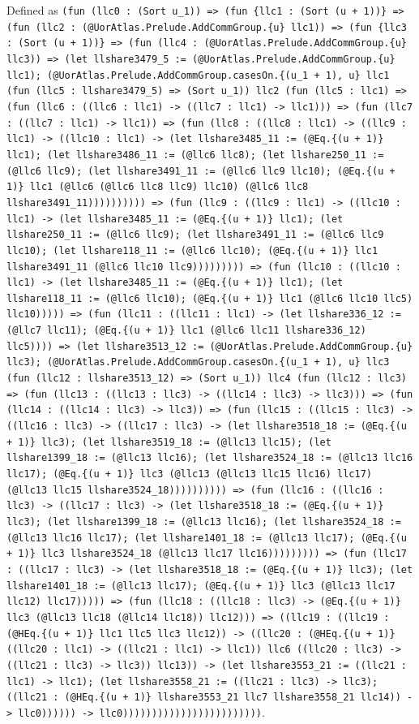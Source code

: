 \documentclass[11pt]{article}
\begin{document}
\noindent Defined as \texttt{(fun (llc0 : (Sort u\_1)) => (fun \{llc1 : (Sort (u + 1))\} => (fun (llc2 : (@UorAtlas.Prelude.AddCommGroup.\{u\} llc1)) => (fun \{llc3 : (Sort (u + 1))\} => (fun (llc4 : (@UorAtlas.Prelude.AddCommGroup.\{u\} llc3)) => (let llshare3479\_5 := (@UorAtlas.Prelude.AddCommGroup.\{u\} llc1); (@UorAtlas.Prelude.AddCommGroup.casesOn.\{(u\_1 + 1), u\} llc1 (fun (llc5 : llshare3479\_5) => (Sort u\_1)) llc2 (fun (llc5 : llc1) => (fun (llc6 : ((llc6 : llc1) -> ((llc7 : llc1) -> llc1))) => (fun (llc7 : ((llc7 : llc1) -> llc1)) => (fun (llc8 : ((llc8 : llc1) -> ((llc9 : llc1) -> ((llc10 : llc1) -> (let llshare3485\_11 := (@Eq.\{(u + 1)\} llc1); (let llshare3486\_11 := (@llc6 llc8); (let llshare250\_11 := (@llc6 llc9); (let llshare3491\_11 := (@llc6 llc9 llc10); (@Eq.\{(u + 1)\} llc1 (@llc6 (@llc6 llc8 llc9) llc10) (@llc6 llc8 llshare3491\_11)))))))))) => (fun (llc9 : ((llc9 : llc1) -> ((llc10 : llc1) -> (let llshare3485\_11 := (@Eq.\{(u + 1)\} llc1); (let llshare250\_11 := (@llc6 llc9); (let llshare3491\_11 := (@llc6 llc9 llc10); (let llshare118\_11 := (@llc6 llc10); (@Eq.\{(u + 1)\} llc1 llshare3491\_11 (@llc6 llc10 llc9))))))))) => (fun (llc10 : ((llc10 : llc1) -> (let llshare3485\_11 := (@Eq.\{(u + 1)\} llc1); (let llshare118\_11 := (@llc6 llc10); (@Eq.\{(u + 1)\} llc1 (@llc6 llc10 llc5) llc10))))) => (fun (llc11 : ((llc11 : llc1) -> (let llshare336\_12 := (@llc7 llc11); (@Eq.\{(u + 1)\} llc1 (@llc6 llc11 llshare336\_12) llc5)))) => (let llshare3513\_12 := (@UorAtlas.Prelude.AddCommGroup.\{u\} llc3); (@UorAtlas.Prelude.AddCommGroup.casesOn.\{(u\_1 + 1), u\} llc3 (fun (llc12 : llshare3513\_12) => (Sort u\_1)) llc4 (fun (llc12 : llc3) => (fun (llc13 : ((llc13 : llc3) -> ((llc14 : llc3) -> llc3))) => (fun (llc14 : ((llc14 : llc3) -> llc3)) => (fun (llc15 : ((llc15 : llc3) -> ((llc16 : llc3) -> ((llc17 : llc3) -> (let llshare3518\_18 := (@Eq.\{(u + 1)\} llc3); (let llshare3519\_18 := (@llc13 llc15); (let llshare1399\_18 := (@llc13 llc16); (let llshare3524\_18 := (@llc13 llc16 llc17); (@Eq.\{(u + 1)\} llc3 (@llc13 (@llc13 llc15 llc16) llc17) (@llc13 llc15 llshare3524\_18)))))))))) => (fun (llc16 : ((llc16 : llc3) -> ((llc17 : llc3) -> (let llshare3518\_18 := (@Eq.\{(u + 1)\} llc3); (let llshare1399\_18 := (@llc13 llc16); (let llshare3524\_18 := (@llc13 llc16 llc17); (let llshare1401\_18 := (@llc13 llc17); (@Eq.\{(u + 1)\} llc3 llshare3524\_18 (@llc13 llc17 llc16))))))))) => (fun (llc17 : ((llc17 : llc3) -> (let llshare3518\_18 := (@Eq.\{(u + 1)\} llc3); (let llshare1401\_18 := (@llc13 llc17); (@Eq.\{(u + 1)\} llc3 (@llc13 llc17 llc12) llc17))))) => (fun (llc18 : ((llc18 : llc3) -> (@Eq.\{(u + 1)\} llc3 (@llc13 llc18 (@llc14 llc18)) llc12))) => ((llc19 : ((llc19 : (@HEq.\{(u + 1)\} llc1 llc5 llc3 llc12)) -> ((llc20 : (@HEq.\{(u + 1)\} ((llc20 : llc1) -> ((llc21 : llc1) -> llc1)) llc6 ((llc20 : llc3) -> ((llc21 : llc3) -> llc3)) llc13)) -> (let llshare3553\_21 := ((llc21 : llc1) -> llc1); (let llshare3558\_21 := ((llc21 : llc3) -> llc3); ((llc21 : (@HEq.\{(u + 1)\} llshare3553\_21 llc7 llshare3558\_21 llc14)) -> llc0)))))) -> llc0))))))))))))))))))))))))}.\par
\end{document}
